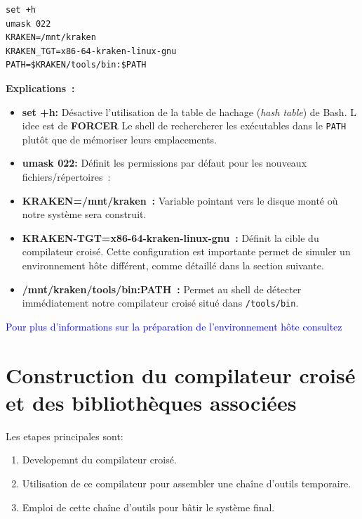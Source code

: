 \begin{verbatim}
set +h
umask 022
KRAKEN=/mnt/kraken
KRAKEN_TGT=x86-64-kraken-linux-gnu
PATH=$KRAKEN/tools/bin:$PATH

\end{verbatim}

\textbf{Explications~:}

\begin{itemize}
    \item \textbf{set +h:} 
          Désactive l'utilisation de la table de hachage (\emph{hash table}) de Bash. 
          L idee est de \textbf{FORCER} Le shell de rechercherer  les exécutables dans le \texttt{PATH}   plutôt que de mémoriser leurs emplacements.

    \item \textbf{umask 022:} 
          Définit les permissions par défaut pour les nouveaux fichiers/répertoires~: 
         

    \item \textbf{KRAKEN=/mnt/kraken~:} 
          Variable pointant vers le disque monté où notre système sera construit.

    \item \textbf{KRAKEN-TGT=x86-64-kraken-linux-gnu~:} 
          Définit la cible du compilateur croisé. Cette configuration est importante permet de simuler un environnement hôte différent, comme détaillé dans la section suivante.

   

    \item \textbf{/mnt/kraken/tools/bin:PATH~:}
            Permet au shell de détecter immédiatement notre compilateur croisé situé dans \texttt{/tools/bin}.
\end{itemize}

\textcolor{blue}{Pour plus d’informations sur  la préparation de l’environnement hôte  consultez \cite{lfs_book} }









\section{Construction du compilateur croisé et des bibliothèques associées}
\label{subsec:build-cross}
Les etapes principales sont:\\
\begin{enumerate}
  \item Developemnt du compilateur croisé.
  \item Utilisation de ce compilateur pour assembler une chaîne d’outils temporaire.
  \item Emploi de cette chaîne d’outils pour bâtir le système final.
\end{enumerate}


